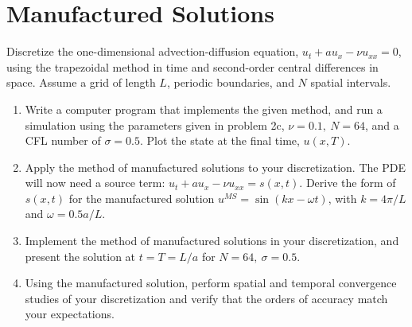 \pagebreak
\section{Manufactured Solutions}
Discretize the one-dimensional advection-diffusion equation, $u_t + au_x - \nu u_{xx}= 0$, using the trapezoidal method in time and second-order central differences in space. Assume a grid of length $L$, periodic boundaries, and $N$ spatial intervals.


\begin{enumerate}[label=\alph*., start = 1]
    \item Write a computer program that implements the given method, and run a simulation using the parameters given in problem 2c, $\nu= 0.1,\ N= 64$, and a CFL number of $\sigma= 0.5$.  Plot the state at the final time, $u(x,T)$.
    \item Apply the method of manufactured solutions to your discretization.  The PDE will now need a source term: $u_t+au_x - \nu u_{xx}=s(x,t)$. Derive the form of $s(x,t)$ for the manufactured solution $u^{MS}= \sin{(kx -\omega t)}$, with $k= 4\pi/L$ and $\omega= 0.5a/L$.
    \item Implement the method of manufactured solutions in your discretization, and present the solution at $t=T=L/a$ for $N= 64,\ \sigma= 0.5$.
    \item Using the manufactured solution,  perform spatial and temporal convergence  studies of your discretization and verify that the orders of accuracy match your expectations.
\end{enumerate}